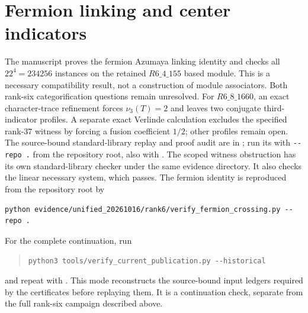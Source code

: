\documentclass[11pt]{article}
\begin{document}
\section{Fermion linking and center indicators}
The manuscript proves the fermion Azumaya linking
identity and checks all $22^4=234256$ instances on the retained
$R6\_4\_155$ based module. This is a necessary compatibility result,
not a construction of module associators. Both rank-six categorification
questions remain unresolved. For $R6\_8\_1660$, an exact character-trace
refinement forces $\nu_3(T)=2$ and leaves two conjugate third-indicator
profiles. A separate exact Verlinde calculation excludes the specified
rank-$37$ witness by forcing a fusion coefficient $1/2$; other profiles
remain open. The source-bound
standard-library replay and proof audit are in
; run its
 with \verb|--repo .| from the repository
root, also with . The scoped witness obstruction has its own
standard-library checker
under the same evidence directory. It also checks the linear necessary
system, which passes. The fermion identity is reproduced from the
repository root by
\begin{verbatim}
python evidence/unified_20261016/rank6/verify_fermion_crossing.py --repo .
\end{verbatim}
For the complete continuation, run
\begin{quote}\small
\verb|python3 tools/verify_current_publication.py --historical|
\end{quote}
and repeat with . This mode reconstructs the source-bound
input ledgers required by the certificates before replaying them. It is
a continuation check, separate from the full rank-six campaign described
above.
\end{document}
